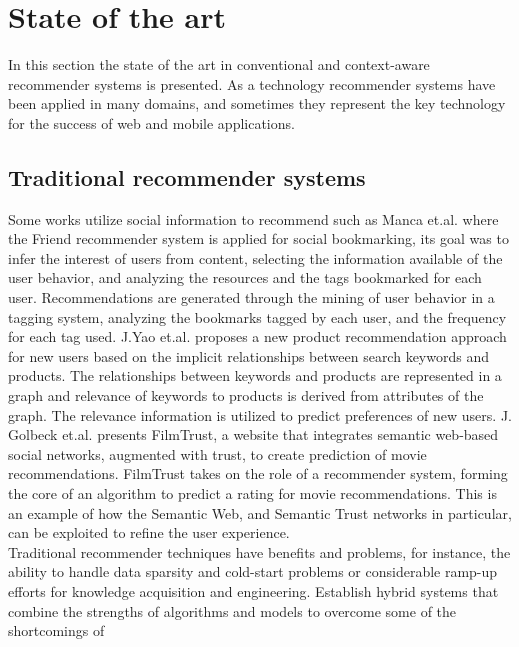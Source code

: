 \chapter{State of the art} \label{stateoftheart}

In this section the state of the art in conventional and
context-aware recommender systems is presented. 
As a technology recommender systems have been applied 
in many domains, and sometimes they represent the  key
technology for the success of web and mobile applications.

\section{Traditional recommender systems} 
Some works utilize social information to recommend such
as Manca et.al. \cite{manca2014mining} where the Friend recommender
system is applied for social bookmarking, its goal was to
infer the interest of users from content, selecting the 
information available of the user behavior, and analyzing the resources and the
tags bookmarked for each user. Recommendations are generated
through the mining of user behavior in a tagging system, analyzing the
bookmarks tagged by each user, and the frequency for each tag used. 
J.Yao et.al. \cite{yao2012product} proposes a new product recommendation
approach for new users based on the implicit relationships between
search keywords and products. The relationships between keywords and
products are represented in a graph and relevance of keywords to
products is derived from attributes of the graph.
The relevance
information is utilized to predict preferences of new users. J.
Golbeck et.al. \cite{golbeck2006filmtrust} presents FilmTrust, a
website that integrates semantic web-based social networks, augmented
with trust, to create prediction of movie recommendations. FilmTrust takes on
the role of a recommender system, forming the core of an algorithm to
predict a rating for movie recommendations. This is an example of
how the Semantic Web, and Semantic Trust networks in particular, can
be exploited to refine the user experience. \\  
Traditional recommender techniques have benefits and problems, for
instance, the ability to handle data sparsity and cold-start problems
or considerable ramp-up efforts for knowledge acquisition and
engineering. Establish hybrid systems that combine the strengths of
algorithms and models to overcome some of the shortcomings of
